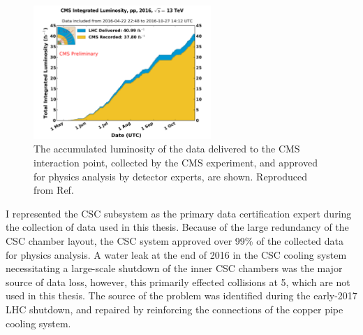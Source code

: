 \begin{figure}[htbp]
  \centering
   \includegraphics[width=0.6\textwidth]{figures/LHCandCMS/int_lumi_per_day_cumulative_pp_2016.pdf}
  \caption{
    The accumulated luminosity of the data delivered to the CMS interaction point, 
    collected by the CMS experiment, and approved for physics analysis by detector
    experts, are shown. Reproduced from Ref.~\cite{lumiTwiki}
        }
 \label{fig:lumi}
\end{figure}

I represented the CSC subsystem as the primary data certification expert during 
the collection of data used in this thesis.
Because of the large redundancy of the CSC chamber layout, the CSC system approved over 99\% of the
collected data for physics analysis. A water leak at the end of 2016 in the CSC cooling system 
necessitating a large-scale shutdown of the inner 
CSC chambers was the major source of data loss, however, this primarily effected \pp collisions
at 5\TeV, which are not used in this thesis. The source of the problem was identified during
the early-2017 LHC shutdown, and repaired by reinforcing the connections of the copper pipe cooling system.
